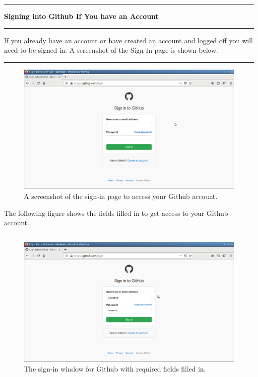 \documentclass[10pt,fleqn]{article}
\begin{document}
\eject
\vskip0.1in\hrule\vskip0.1in\noindent
{\bf Signing into Github If You have an Account} 
\vskip0.1in\hrule\vskip0.1in\noindent
If you already have an account or have created an account and logged off you
will need to be signed in. A screenshot of the Sign In page is shown below.
\vskip0.1in\hrule\vskip0.1in
\vfill
\begin{figure}[h]
\centering
\includegraphics[width=5.0in]{../images/github_02.png}
\vskip0.1in
\caption{A screenshot of the sign-in page to access your Github account.}
\end{figure}
The following figure shows the fields filled in to get access to your Github
account.
\vskip0.1in\hrule\vskip0.1in
\vfill
\begin{figure}[h]
\centering
\includegraphics[width=5.0in]{../images/github_03.png}
\caption{The sign-in window for Github with required fields filled in.
}
\end{figure}
\eject
\end{document}
